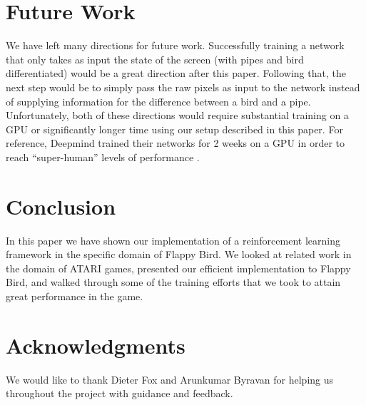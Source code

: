 \documentclass{chi2009}
\begin{document}
\section{Future Work}

We have left many directions for future work. Successfully training a network that only takes as input the state of the screen (with pipes and bird differentiated) would be a great direction after this paper. Following that, the next step would be to simply pass the raw pixels as input to the network instead of supplying information for the difference between a bird and a pipe. Unfortunately, both of these directions would require substantial training on a GPU or significantly longer time using our setup described in this paper. For reference, Deepmind trained their networks for 2 weeks on a GPU in order to reach ``super-human'' levels of performance \cite{mnih2013playing}.

\section{Conclusion}

In this paper we have shown our implementation of a reinforcement learning framework in the specific domain of Flappy Bird. We looked at related work in the domain of ATARI games, presented our efficient implementation to Flappy Bird, and walked through some of the training efforts that we took to attain great performance in the game.

\section{Acknowledgments}

We would like to thank Dieter Fox and Arunkumar Byravan for helping us throughout the project with guidance and feedback.



\end{document}
